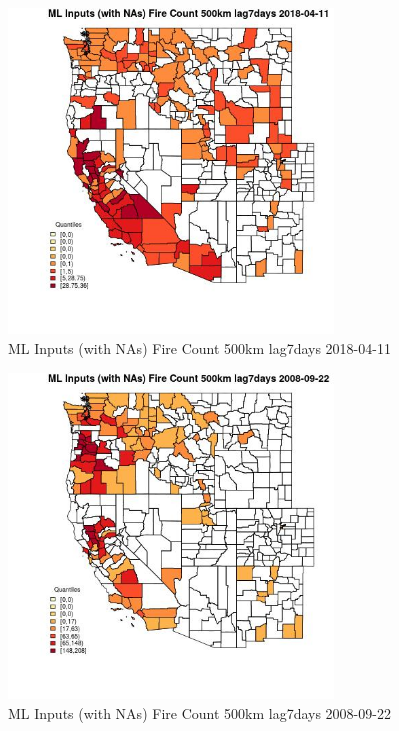 \begin{figure} 
\centering  
\includegraphics[width=0.77\textwidth]{Code_Outputs/Report_ML_input_PM25_Step4_part_e_de_duplicated_aves_compiled_2019-05-18wNAs_CountyFire_Count_500km_lag7daysMean2018-04-11_2018-04-11.jpg} 
\caption{\label{fig:Report_ML_input_PM25_Step4_part_e_de_duplicated_aves_compiled_2019-05-18wNAsCountyFire_Count_500km_lag7daysMean2018-04-11_2018-04-11}ML Inputs (with NAs) Fire Count 500km lag7days 2018-04-11} 
\end{figure} 
 

\begin{figure} 
\centering  
\includegraphics[width=0.77\textwidth]{Code_Outputs/Report_ML_input_PM25_Step4_part_e_de_duplicated_aves_compiled_2019-05-18wNAs_CountyFire_Count_500km_lag7daysMean2008-09-22_2008-09-22.jpg} 
\caption{\label{fig:Report_ML_input_PM25_Step4_part_e_de_duplicated_aves_compiled_2019-05-18wNAsCountyFire_Count_500km_lag7daysMean2008-09-22_2008-09-22}ML Inputs (with NAs) Fire Count 500km lag7days 2008-09-22} 
\end{figure} 
 

